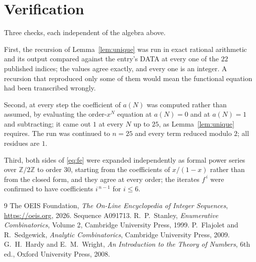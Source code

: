 \documentclass[11pt,a4paper]{article}
\theoremstyle{plain}
\theoremstyle{definition}
\begin{document}
\section{Verification}

Three checks, each independent of the algebra above.

First, the recursion of Lemma~\ref{lem:unique} was run in exact rational arithmetic and
its output compared against the entry's DATA at every one of the $22$ published
indices; the values agree exactly, and every one is an integer. A recursion that reproduced
only some of them would mean the functional equation had been transcribed wrongly.

Second, at every step the coefficient of $a(N)$ was computed rather than assumed, by
evaluating the order-$x^{N}$ equation at $a(N)=0$ and at $a(N)=1$ and subtracting; it came
out $1$ at every $N$ up to $25$, as Lemma~\ref{lem:unique} requires. The run was continued
to $n=25$ and every term reduced modulo $2$; all residues are $1$.

Third, both sides of \eqref{eq:fe} were expanded independently as formal power series over
$\mathbb{Z}/2\mathbb{Z}$ to order $30$, starting from the coefficients of $x/(1-x)$
rather than from the closed form, and they agree at every order; the iterates $f^{\,i}$
were confirmed to have coefficients $i^{\,n-1}$ for $i\le6$.

\begin{thebibliography}{9}
 The OEIS Foundation, \emph{The On-Line Encyclopedia of Integer
Sequences}, \url{https://oeis.org}, 2026. Sequence A091713.
 R.~P.~Stanley, \emph{Enumerative Combinatorics}, Volume 2, Cambridge
University Press, 1999.
 P.~Flajolet and R.~Sedgewick, \emph{Analytic Combinatorics}, Cambridge
University Press, 2009.
 G.~H.~Hardy and E.~M.~Wright, \emph{An Introduction to the Theory of
Numbers}, 6th ed., Oxford University Press, 2008.
\end{thebibliography}
\end{document}
